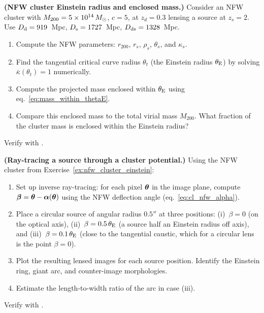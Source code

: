 \begin{exercise}
\label{ex:nfw_cluster_einstein}
\textbf{(NFW cluster Einstein radius and enclosed mass.)}
Consider an NFW cluster with $M_{200} = 5\times 10^{14}\,M_{\odot}$, $c = 5$,
at $z_d = 0.3$ lensing a source at $z_s = 2$.  Use
$D_{\mathrm{d}} = 919$~Mpc, $D_{\mathrm{s}} = 1727$~Mpc, $D_{\mathrm{ds}} = 1328$~Mpc.
\begin{enumerate}[label=(\alph*)]
    \item Compute the NFW parameters: $r_{200}$, $r_s$, $\rho_s$,
          $\theta_s$, and $\kappa_s$.
    \item Find the tangential critical curve radius $\theta_t$ (the
          Einstein radius $\theta_{\mathrm{E}}$) by solving
          $\bar{\kappa}(\theta_t) = 1$ numerically.
    \item Compute the projected mass enclosed within $\theta_{\mathrm{E}}$ using
          eq.~\eqref{eq:mass_within_thetaE}.
    \item Compare this enclosed mass to the total virial mass
          $M_{200}$.  What fraction of the cluster mass is enclosed
          within the Einstein radius?
\end{enumerate}
Verify with
.
\end{exercise}

\begin{exercise}
\label{ex:ray_trace_arc}
\textbf{(Ray-tracing a source through a cluster potential.)}
Using the NFW cluster from Exercise~\ref{ex:nfw_cluster_einstein}:
\begin{enumerate}[label=(\alph*)]
    \item Set up inverse ray-tracing: for each pixel $\boldsymbol{\theta}$ in
          the image plane, compute
          $\boldsymbol{\beta} = \boldsymbol{\theta} - \boldsymbol{\alpha}(\boldsymbol{\theta})$ using the
          NFW deflection angle (eq.~\ref{eq:cl_nfw_alpha}).
    \item Place a circular source of angular radius $0.5''$ at three
          positions: (i)~$\beta = 0$ (on the optical axis),
          (ii)~$\beta = 0.5\,\theta_{\mathrm{E}}$ (a source half an Einstein radius off axis),
          and (iii)~$\beta = 0.1\,\theta_{\mathrm{E}}$ (close to the tangential caustic,
          which for a circular lens is the point $\beta = 0$).
    \item Plot the resulting lensed images for each source position.
          Identify the Einstein ring, giant arc, and counter-image
          morphologies.
    \item Estimate the length-to-width ratio of the arc in case (iii).
\end{enumerate}
Verify with
.
\end{exercise}

